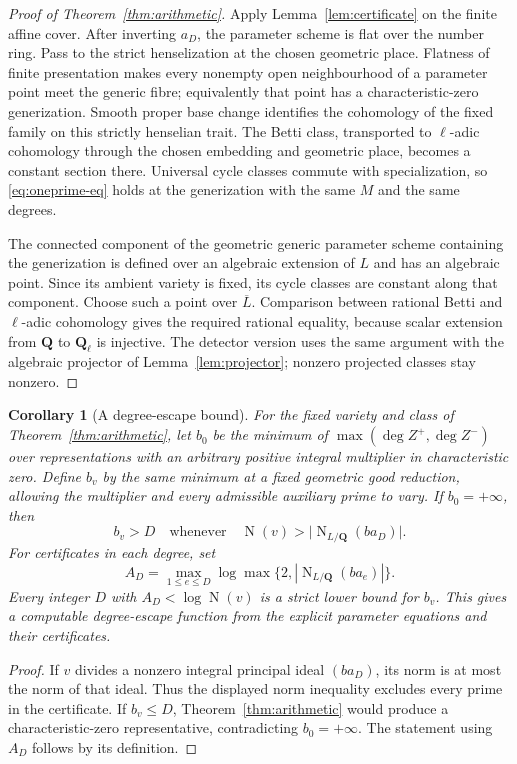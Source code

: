 \documentclass[11pt]{article}
\newtheorem{corollary}[theorem]{Corollary}
\theoremstyle{definition}
\theoremstyle{remark}
\newcommand{\Q}{\mathbf Q}
\newcommand{\Nm}{\operatorname{N}}
\begin{document}
\begin{proof}[Proof of Theorem~\ref{thm:arithmetic}]
Apply Lemma~\ref{lem:certificate} on the finite affine cover.
After inverting $a_D$, the parameter scheme is flat over the
number ring. Pass to the strict henselization at the chosen
geometric place. Flatness of finite presentation makes every
nonempty open neighbourhood of a parameter point meet the
generic fibre; equivalently that point has a characteristic-zero
generization. Smooth proper base change identifies the cohomology
of the fixed family on this strictly henselian trait. The Betti
class, transported to $\ell$-adic cohomology through the chosen
embedding and geometric place, becomes a constant section there.
Universal cycle classes commute with specialization, so
\eqref{eq:oneprime-eq} holds at the generization with the same
$M$ and the same degrees.

The connected component of the geometric generic parameter
scheme containing the generization is defined over an algebraic
extension of $L$ and has an algebraic point. Since its ambient
variety is fixed, its cycle classes are constant along that
component. Choose such a point over $\overline L$. Comparison
between rational Betti and $\ell$-adic cohomology gives the
required rational equality, because scalar extension from
$\Q$ to $\Q_\ell$ is injective. The detector version uses
the same argument with the algebraic projector of
Lemma~\ref{lem:projector}; nonzero projected classes stay nonzero.
\end{proof}

\begin{corollary}[A degree-escape bound]\label{cor:escape}
For the fixed variety and class of Theorem~\ref{thm:arithmetic},
let $b_0$ be the minimum of
$\max(\deg Z^+,\deg Z^-)$ over representations with an arbitrary
positive integral multiplier in characteristic zero.  Define $b_v$
by the same minimum at a fixed geometric good reduction, allowing
the multiplier and every admissible auxiliary prime to vary. If $b_0=+\infty$,
then
\begin{equation}
 b_v>D\quad\text{whenever}\quad
 \Nm(v)>\bigl|\Nm_{L/\Q}(ba_D)\bigr|.
 \label{eq:escape}
\end{equation}
For certificates in each degree, set
\[
 A_D=\max_{1\leq e\leq D}
  \log\max\{2,|\Nm_{L/\Q}(ba_e)|\}.
\]
Every integer $D$ with $A_D<\log\Nm(v)$ is a strict lower
bound for $b_v$. This gives a computable degree-escape function
from the explicit parameter equations and their certificates.
\end{corollary}
\begin{proof}
If $v$ divides a nonzero integral principal ideal $(ba_D)$,
its norm is at most the norm of that ideal. Thus the displayed
norm inequality excludes every prime in the certificate. If
$b_v\leq D$, Theorem~\ref{thm:arithmetic} would produce a
characteristic-zero representative, contradicting $b_0=+\infty$.
The statement using $A_D$ follows by its definition.
\end{proof}
\end{document}

